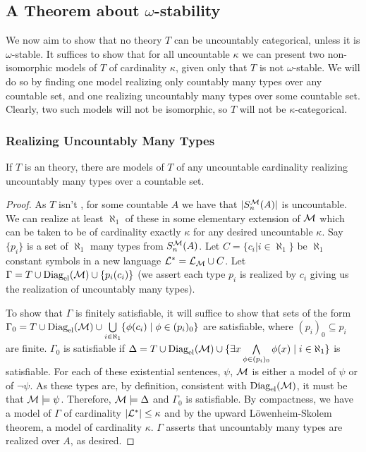 \subsection{A Theorem about \(\omega\)-stability}
We now aim to show that no theory \(T\) can be uncountably categorical, unless it is \(\omega\)-stable.
It suffices to show that for all uncountable \(\kappa\) we can present two non-isomorphic models of \(T\) of cardinality \(\kappa\), given only that \(T\) is not \(\omega\)-stable.  
We will do so by finding one model realizing only countably many types over any countable set, and one realizing uncountably many types over some countable set. 
Clearly, two such models will not be isomorphic, so \(T\) will not be \(\kappa\)-categorical. 

\subsubsection{Realizing Uncountably Many Types}
\begin{theorem}\label{theorem_realizing_uncountable_types}
If \(T\) is an \omst theory, there are models of \(T\) of any uncountable cardinality realizing uncountably many types over a countable set.
\end{theorem}

\begin{proof}
As \(T\) isn't \omst, for some countable \(A\) we have that \(|S_n^{\mathcal{M}}(A)|\) is uncountable. 
We can realize at least \(\aleph_1\) of these in some elementary extension of \(\mathcal{M}\) which can be taken to be of cardinality exactly \(\kappa\) for any desired uncountable \(\kappa\).
Say \(\{p_i\}\) is a set of \(\aleph_1\) many types from \(S_n^{\mathcal{M}}(A)\).
Let \(C = \{c_i| i \in \aleph_1\} \) be \(\aleph_1\) constant symbols in a new language \(\mathcal{L}^* = \mathcal{L}_{\mathcal{M}} \cup C\). 
Let \(\Gamma = T \cup \text{Diag}_\text{el}(\mathcal{M}) \cup \{p_i(c_i)\}\) (we assert each type \(p_i\) is realized by \(c_i\) giving us the realization of uncountably many types).
 
To show that \(\Gamma\) is finitely satisfiable, it will suffice to show that sets of the form \(\Gamma_0 = T \cup \text{Diag}_\text{el}(\mathcal{M}) \cup \bigcup\limits_{i \in \aleph_1}\{\phi(c_i) \mid \phi \in (p_i)_0\}\) are satisfiable, where \((p_i)_0 \subseteq p_i\) are finite.  
\(\Gamma_0\) is satisfiable if \(\Delta = T \cup \text{Diag}_\text{el}(\mathcal{M}) \cup \{\exists x \bigwedge\limits_{\phi \in (p_i)_0} \phi(x) \mid i \in \aleph_1\}\) is satisfiable.
For each of these existential sentences, \(\psi\), \(\mathcal{M}\) is either a model of \(\psi\) or of \(\neg \psi\). 
As these types are, by definition, consistent with \(\text{Diag}_\text{el}(\mathcal{M})\), it must be that \(\mathcal{M} \models \psi\). 
Therefore, \(\mathcal{M} \models \Delta\) and \(\Gamma_0\) is satisfiable. 
By compactness, we have a model of \(\Gamma\) of cardinality \(|\mathcal{L}^*| \leq \kappa\) and by the upward L\"owenheim-Skolem theorem, a model of cardinality \(\kappa\).
\(\Gamma\) asserts that uncountably many types are realized over \(A\), as desired. 
\end{proof}

